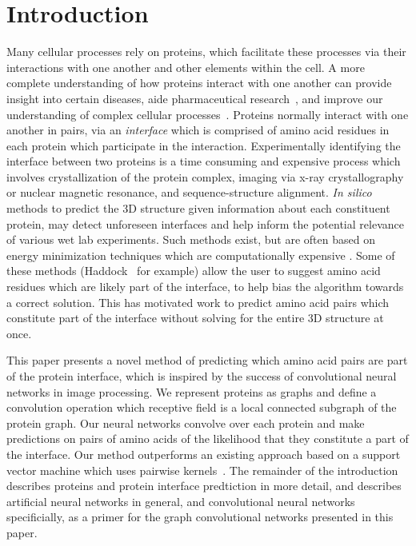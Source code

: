 \chapter{Introduction}
\label{chap:intro}

Many cellular processes rely on proteins, which facilitate these processes via their interactions with one another and other elements within the cell. 
A more complete understanding of how proteins interact with one another can provide insight into certain diseases, aide pharmaceutical research~\cite{fauman2003}, and improve our understanding of complex cellular processes~\cite{altman2003}.
Proteins normally interact with one another in pairs, via an \textit{interface} which is comprised of amino acid residues in each protein which participate in the interaction.
Experimentally identifying the interface between two proteins is a time consuming and expensive process which involves crystallization of the protein complex, imaging via x-ray crystallography or nuclear magnetic resonance, and sequence-structure alignment. 
\textit{In silico} methods to predict the 3D structure given information about each constituent protein, may detect unforeseen interfaces and help inform the potential relevance of various wet lab experiments.
Such methods exist, but are often based on energy minimization techniques which are computationally expensive \cite{esmaielbeiki2015}.
Some of these methods (Haddock~\cite{zundert2016} for example) allow the user to suggest amino acid residues which are likely part of the interface, to help bias the algorithm towards a correct solution.
This has motivated work to predict amino acid pairs which constitute part of the interface without solving for the entire 3D structure at once. 

This paper presents a novel method of predicting which amino acid pairs are part of the protein interface, which is inspired by the success of convolutional neural networks in image processing. 
We represent proteins as graphs and define a convolution operation which receptive field is a local connected subgraph of the protein graph.
Our neural networks convolve over each protein and make predictions on pairs of amino acids of the likelihood that they constitute a part of the interface. 
Our method outperforms an existing approach based on a support vector machine which uses pairwise kernels~\cite{minhas2014}.
The remainder of the introduction describes proteins and protein interface predtiction in more detail, and describes artificial neural networks in general, and convolutional neural networks specificially, as a primer for the graph convolutional networks presented in this paper.

